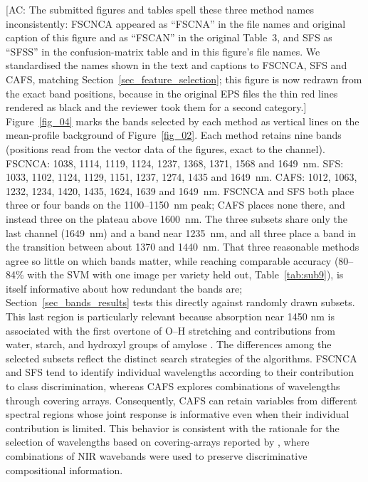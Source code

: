 \documentclass[final,5p,times,twocolumn]{elsarticle}
\newcommand{\added}[1]{{\color{blue}#1}}
\newcommand{\acnote}[1]{{\color{red}\small\textsf{[AC: #1]}}}
\begin{document}
\acnote{The submitted figures and tables spell these three method names inconsistently: FSCNCA appeared as ``FSCNA'' in the file names and original caption of this figure and as ``FSCAN'' in the original Table~3, and SFS as ``SFSS'' in the confusion-matrix table and in this figure's file names. We standardised the names shown in the text and captions to FSCNCA, SFS and CAFS, matching Section~\ref{sec_feature_selection}; this figure is now redrawn from the exact band positions, because in the original EPS files the thin red lines rendered as black and the reviewer took them for a second category.}
\added{Figure~\ref{fig_04} marks the bands selected by each method as vertical lines on the mean-profile background of Figure~\ref{fig_02}. Each method retains nine bands (positions read from the vector data of the figures, exact to the channel). FSCNCA: 1038, 1114, 1119, 1124, 1237, 1368, 1371, 1568 and 1649~nm. SFS: 1033, 1102, 1124, 1129, 1151, 1237, 1274, 1435 and 1649~nm. CAFS: 1012, 1063, 1232, 1234, 1420, 1435, 1624, 1639 and 1649~nm. FSCNCA and SFS both place three or four bands on the 1100--1150~nm peak; CAFS places none there, and instead three on the plateau above 1600~nm. The three subsets share only the last channel (1649~nm) and a band near 1235~nm, and all three place a band in the transition between about 1370 and 1440~nm. That three reasonable methods agree so little on which bands matter, while reaching comparable accuracy (80--84\% with the SVM with one image per variety held out, Table~\ref{tab:sub9}), is itself informative about how redundant the bands are; Section~\ref{sec_bands_results} tests this directly against randomly drawn subsets.}
This \added{last} region is particularly relevant because absorption near 1450 nm is associated with the first overtone of O–H stretching and contributions from water, starch, and hydroxyl groups of amylose \cite{Onmarkhong2022}.
The differences among the selected subsets reflect the distinct search strategies of the algorithms. 
FSCNCA and SFS tend to identify individual wavelengths according to their contribution to class discrimination, whereas CAFS explores combinations of wavelengths through covering arrays. 
Consequently, CAFS can retain variables from different spectral regions whose joint response is informative even when their individual contribution is limited. 
This behavior is consistent with the rationale for the selection of wavelengths based on covering-arrays reported by \citet{Castro2022cafs}, where combinations of NIR wavebands were used to preserve discriminative compositional information. 
\end{document}

